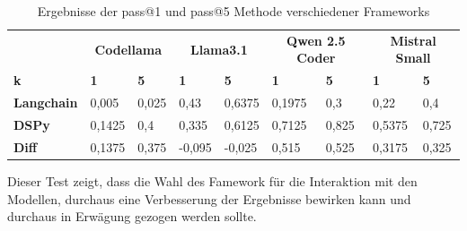 \begin{table}[!ht]
	\begin{tabular}{|l|ll|ll|ll|ll|}
		\hline
		& \multicolumn{2}{c|}{\textbf{Codellama}} & \multicolumn{2}{c|}{\textbf{Llama3.1}} & \multicolumn{2}{c|}{\textbf{Qwen 2.5 Coder}} & \multicolumn{2}{c|}{\textbf{Mistral Small}} \\
		\textbf{k} & \textbf{1} & \textbf{5} & \textbf{1} & \textbf{5} & \textbf{1} & \textbf{5} & \textbf{1} & \textbf{5} \\
		\hline
		\textbf{Langchain}  & 0,005  & 0,025 & 0,43   & 0,6375 & 0,1975 & 0,3   & 0,22   & 0,4 \\
		\textbf{DSPy}       & 0,1425 & 0,4   & 0,335  & 0,6125 & 0,7125 & 0,825 & 0,5375 & 0,725 \\
		\hline
		\textbf{Diff}       & 0,1375 & 0,375 & -0,095 & -0,025 & 0,515  & 0,525 & 0,3175 & 0,325 \\
		\hline
		\hline
	\end{tabular}
	\centering
	\label{tab:pass_at_k_results_by_framework}
	\caption{Ergebnisse der pass@1 und pass@5 Methode verschiedener Frameworks}
\end{table}

Dieser Test zeigt, dass die Wahl des Famework für die Interaktion mit den Modellen, durchaus eine Verbesserung der Ergebnisse bewirken kann und durchaus in Erwägung gezogen werden sollte.
